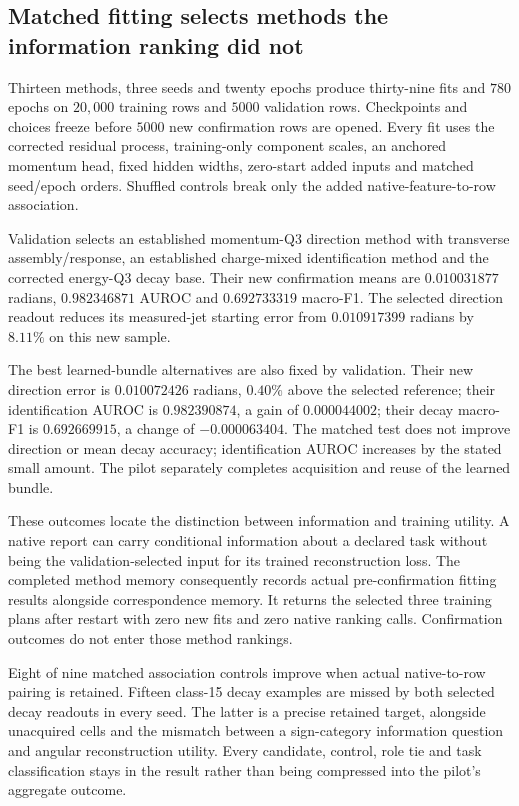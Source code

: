\subsection{Matched fitting selects methods the information ranking did not}

Thirteen methods, three seeds and twenty epochs produce thirty-nine fits and $780$ epochs on $20{,}000$ training rows and $5000$ validation rows. Checkpoints and choices freeze before $5000$ new confirmation rows are opened. Every fit uses the corrected residual process, training-only component scales, an anchored momentum head, fixed hidden widths, zero-start added inputs and matched seed/epoch orders. Shuffled controls break only the added native-feature-to-row association. 

Validation selects an established momentum-Q3 direction method with transverse assembly/response, an established charge-mixed identification method and the corrected energy-Q3 decay base. Their new confirmation means are $0.010031877$ radians, $0.982346871$ AUROC and $0.692733319$ macro-F1. The selected direction readout reduces its measured-jet starting error from $0.010917399$ radians by $8.11\%$ on this new sample.

The best learned-bundle alternatives are also fixed by validation. Their new direction error is $0.010072426$ radians, $0.40\%$ above the selected reference; their identification AUROC is $0.982390874$, a gain of $0.000044002$; their decay macro-F1 is $0.692669915$, a change of $-0.000063404$. The matched test does not improve direction or mean decay accuracy; identification AUROC increases by the stated small amount. The pilot separately completes acquisition and reuse of the learned bundle.

These outcomes locate the distinction between information and training utility. A native report can carry conditional information about a declared task without being the validation-selected input for its trained reconstruction loss. The completed method memory consequently records actual pre-confirmation fitting results alongside correspondence memory. It returns the selected three training plans after restart with zero new fits and zero native ranking calls. Confirmation outcomes do not enter those method rankings.

Eight of nine matched association controls improve when actual native-to-row pairing is retained. Fifteen class-15 decay examples are missed by both selected decay readouts in every seed. The latter is a precise retained target, alongside unacquired cells and the mismatch between a sign-category information question and angular reconstruction utility. Every candidate, control, role tie and task classification stays in the result rather than being compressed into the pilot's aggregate outcome.

